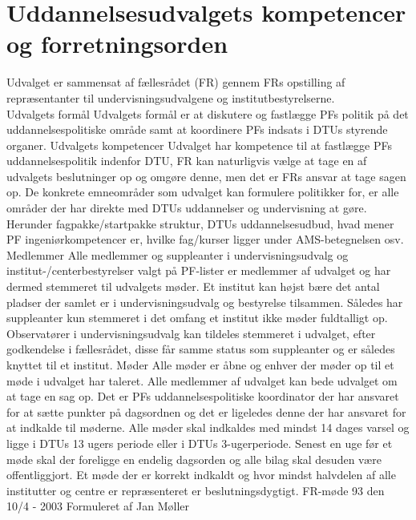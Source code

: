 \section{Uddannelsesudvalgets kompetencer og forretningsorden}
Udvalget er sammensat af fællesrådet (FR) gennem FRs opstilling af repræsentanter til undervisningsudvalgene og
institutbestyrelserne.\\
Udvalgets formål
Udvalgets formål er at diskutere og fastlægge PFs politik på det uddannelsespolitiske område samt at koordinere PFs
indsats i DTUs styrende organer.
Udvalgets kompetencer
Udvalget har kompetence til at fastlægge PFs uddannelsespolitik indenfor DTU, FR kan naturligvis vælge at tage en af
udvalgets beslutninger op og omgøre denne, men det er FRs ansvar at tage sagen op.
De konkrete emneområder som udvalget kan formulere politikker for, er alle områder der har direkte med DTUs
uddannelser og undervisning at gøre. Herunder fagpakke/startpakke struktur, DTUs uddannelsesudbud, hvad mener PF
ingeniørkompetencer er, hvilke fag/kurser ligger under AMS-betegnelsen osv.
Medlemmer
Alle medlemmer og suppleanter i undervisningsudvalg og institut-/centerbestyrelser valgt på PF-lister er medlemmer af
udvalget og har dermed stemmeret til udvalgets møder. Et institut kan højst bære det antal pladser der samlet er i
undervisningsudvalg og bestyrelse tilsammen. Således har suppleanter kun stemmeret i det omfang et institut ikke
møder fuldtalligt op.
Observatører i undervisningsudvalg kan tildeles stemmeret i udvalget, efter godkendelse i fællesrådet, disse får samme
status som suppleanter og er således knyttet til et institut.
Møder
Alle møder er åbne og enhver der møder op til et møde i udvalget har taleret. Alle medlemmer af udvalget kan bede
udvalget om at tage en sag op.
Det er PFs uddannelsespolitiske koordinator der har ansvaret for at sætte punkter på dagsordnen og det er ligeledes
denne der har ansvaret for at indkalde til møderne.
Alle møder skal indkaldes med mindst 14 dages varsel og ligge i DTUs 13 ugers periode eller i DTUs 3-ugerperiode.
Senest en uge før et møde skal der foreligge en endelig dagsorden og alle bilag skal desuden være offentliggjort.
Et møde der er korrekt indkaldt og hvor mindst halvdelen af alle institutter og centre er repræsenteret er
beslutningsdygtigt.
FR-møde 93 den 10/4 - 2003
Formuleret af Jan Møller
